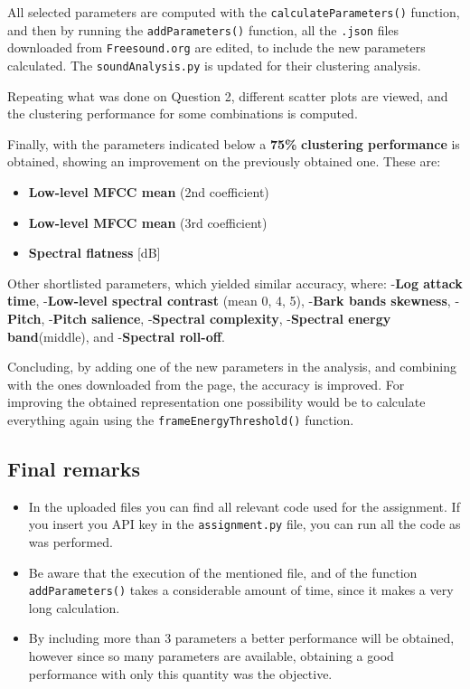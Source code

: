 \documentclass[11pt]{article}
\begin{document}
\vspace{8pt} 
All selected parameters are computed with the \texttt{calculateParameters()} function, and then by running the \texttt{addParameters()} function, all the \texttt{.json} files downloaded from \texttt{Freesound.org} are edited, to include the new parameters calculated. The \texttt{soundAnalysis.py} is updated for their clustering analysis.

\vspace{8pt} 
Repeating what was done on Question 2, different scatter plots are viewed, and the clustering performance for some combinations is computed.

\vspace{8pt}
Finally, with the parameters indicated below a \textbf{75\%} \textbf{clustering performance} is obtained, showing an improvement on the previously obtained one. These are:

\begin{itemize}
	\item \textbf{Low-level MFCC mean} (2nd coefficient)
	\item \textbf{Low-level MFCC mean} (3rd coefficient)
	\item \textbf{Spectral flatness} [dB]
\end{itemize}

Other shortlisted parameters, which yielded similar accuracy, where: -\textbf{Log attack time}, -\textbf{Low-level spectral contrast} (mean 0, 4, 5), -\textbf{Bark bands skewness}, -\textbf{Pitch}, -\textbf{Pitch salience}, -\textbf{Spectral complexity}, -\textbf{Spectral energy band}(middle), and -\textbf{Spectral roll-off}.

\vspace{8pt}
Concluding, by adding one of the new parameters in the analysis, and combining with the ones downloaded from the page, the accuracy is improved. For improving the obtained representation one possibility would be to calculate everything again using the \texttt{frameEnergyThreshold()} function.
\hrulefill

\subsection*{Final remarks}

\begin{itemize}
	\item{In the uploaded files you can find all relevant code used for the assignment. If you insert you API key in the \texttt{assignment.py} file, you can run all the code as was performed.}
	\item{Be aware that the execution of the mentioned file, and of the function \texttt{addParameters()} takes a considerable amount of time, since it makes a very long calculation.}
	\item{By including more than 3 parameters a better performance will be obtained, however since so many parameters are available, obtaining a good performance with only this quantity was the objective.}
\end{itemize}
\end{document}
